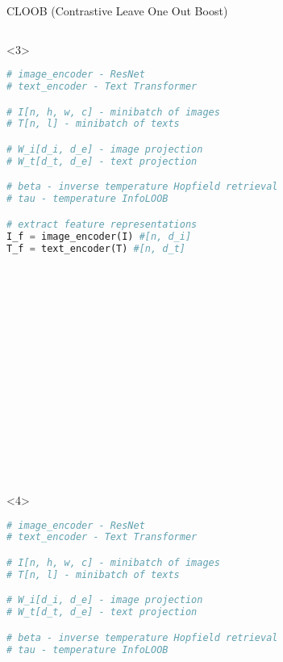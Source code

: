 \documentclass[utf8,aspectratio=169,ngerman,english,usenames,dvipsnames]{beamer}
\begin{document}
\begin{frame}[fragile]{CLOOB (Contrastive Leave One Out Boost)}
\begin{minipage}{0.8\textwidth}
\begin{onlyenv}
\begin{multicols}{2}
\begin{lstlisting}[language=Python, basicstyle=\tiny, firstnumber=last]
 \end{lstlisting}
            \end{multicols}
        \end{onlyenv}

        \begin{onlyenv}<3>
            \begin{multicols}{2}
                \begin{lstlisting}[language=Python, basicstyle=\tiny]
# image_encoder - ResNet
# text_encoder - Text Transformer

# I[n, h, w, c] - minibatch of images
# T[n, l] - minibatch of texts

# W_i[d_i, d_e] - image projection
# W_t[d_t, d_e] - text projection

# beta - inverse temperature Hopfield retrieval
# tau - temperature InfoLOOB

# extract feature representations
I_f = image_encoder(I) #[n, d_i]
T_f = text_encoder(T) #[n, d_t]



 \end{lstlisting}
                \columnbreak
                \begin{lstlisting}[language=Python, basicstyle=\tiny, firstnumber=last]

















 \end{lstlisting}
            \end{multicols}
        \end{onlyenv}

        \begin{onlyenv}<4>
            \begin{multicols}{2}
                \begin{lstlisting}[language=Python, basicstyle=\tiny]
# image_encoder - ResNet
# text_encoder - Text Transformer

# I[n, h, w, c] - minibatch of images
# T[n, l] - minibatch of texts

# W_i[d_i, d_e] - image projection
# W_t[d_t, d_e] - text projection

# beta - inverse temperature Hopfield retrieval
# tau - temperature InfoLOOB


\end{lstlisting}
\end{multicols}
\end{onlyenv}
\end{minipage}
\end{frame}
\end{document}
